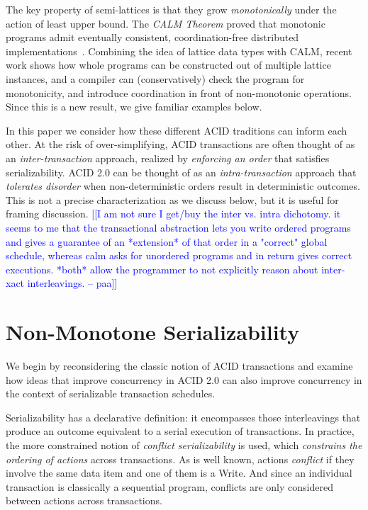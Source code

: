 \documentclass{sig-alternate}
\newcommand{\paa}[1]{{\textcolor{blue}{[[#1 -- paa]]}}}
\begin{document}
The key property of semi-lattices is that they grow \emph{monotonically} under
the action of least upper bound.  The \emph{CALM Theorem} proved that monotonic
programs admit eventually consistent, coordination-free distributed
implementations~\cite{Alvaro2011,Ameloot2011,Hellerstein2010}.  Combining the
idea of lattice data types with CALM, recent work shows how whole programs can
be constructed out of multiple lattice instances, and a compiler can
(conservatively) check the program for monotonicity, and introduce coordination
in front of non-monotonic operations.  Since this is a new result, we give
familiar examples below.

In this paper we consider how these different ACID traditions can inform each
other.  At the risk of over-simplifying, ACID transactions are often thought of
as an \emph{inter-transaction} approach, realized by \emph{enforcing an order}
that satisfies serializability.  ACID 2.0 can be thought of as an
\emph{intra-transaction} approach that \emph{tolerates disorder} when
non-deterministic orders result in deterministic outcomes.  This is not a
precise characterization as we discuss below, but it is useful for framing
discussion.  \paa{I am not sure I get/buy the inter vs. intra dichotomy.  it
  seems to me that the transactional abstraction lets you write ordered programs
  and gives a guarantee of an *extension* of that order in a "correct" global
  schedule, whereas calm asks for unordered programs and in return gives correct
  executions.  *both* allow the programmer to not explicitly reason about
  inter-xact interleavings.}

\section{Non-Monotone Serializability}
We begin by reconsidering the classic notion of ACID transactions and examine
how ideas that improve concurrency in ACID 2.0 can also improve concurrency in
the context of serializable transaction schedules.

Serializability has a declarative definition: it encompasses those interleavings
that produce an outcome equivalent to a serial execution of transactions.  In
practice, the more constrained notion of \emph{conflict serializability} is
used, which \emph{constrains the ordering of actions} across transactions.  As
is well known, actions \emph{conflict} if they involve the same data item and
one of them is a Write.  And since an individual transaction is classically a
sequential program, conflicts are only considered between actions across
transactions.
\end{document}
